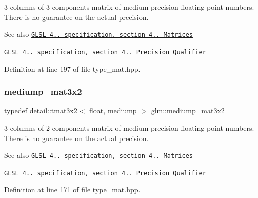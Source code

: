 3 columns of 3 components matrix of medium precision floating-\/point numbers. There is no guarantee on the actual precision.

\begin{DoxySeeAlso}{See also}
\href{http://www.opengl.org/registry/doc/GLSLangSpec.4.20.8.pdf}{\tt G\+L\+SL 4.. specification, section 4.. Matrices} 

\href{http://www.opengl.org/registry/doc/GLSLangSpec.4.20.8.pdf}{\tt G\+L\+SL 4.. specification, section 4.. Precision Qualifier} 
\end{DoxySeeAlso}


Definition at line 197 of file type\+\_\+mat.\+hpp.

\mbox{\label{group__core__precision_ga1215b70c2750b6e9ab813ced8dcae568}} 
\subsubsection{\texorpdfstring{mediump\+\_\+mat3x2}{mediump\_mat3x2}}
{\footnotesize\ttfamily typedef \hyperlink{structglm_1_1detail_1_1tmat3x2}{detail\+::tmat3x2}$<$ float, \hyperlink{namespaceglm_a0f04f086094c747d227af4425893f545a6416f3ea0c9025fb21ed50c4d6620482}{mediump} $>$ \hyperlink{group__core__precision_ga1215b70c2750b6e9ab813ced8dcae568}{glm\+::mediump\+\_\+mat3x2}}

3 columns of 2 components matrix of medium precision floating-\/point numbers. There is no guarantee on the actual precision.

\begin{DoxySeeAlso}{See also}
\href{http://www.opengl.org/registry/doc/GLSLangSpec.4.20.8.pdf}{\tt G\+L\+SL 4.. specification, section 4.. Matrices} 

\href{http://www.opengl.org/registry/doc/GLSLangSpec.4.20.8.pdf}{\tt G\+L\+SL 4.. specification, section 4.. Precision Qualifier} 
\end{DoxySeeAlso}


Definition at line 171 of file type\+\_\+mat.\+hpp.

\mbox{\label{group__core__precision_gae4c7f0d5d3dab712f9a671183e63e5ab}} 

